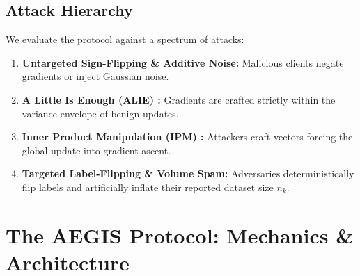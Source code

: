 \documentclass[10pt, conference]{IEEEtran}
\begin{document}
\subsection{Attack Hierarchy}
We evaluate the protocol against a spectrum of attacks:
\begin{enumerate}
    \item \textbf{Untargeted Sign-Flipping \& Additive Noise:} Malicious clients negate gradients or inject Gaussian noise.
    \item \textbf{A Little Is Enough (ALIE) \cite{baruch2019}:} Gradients are crafted strictly within the variance envelope of benign updates.
    \item \textbf{Inner Product Manipulation (IPM) \cite{xie2020ipm}:} Attackers craft vectors forcing the global update into gradient ascent.
    \item \textbf{Targeted Label-Flipping \& Volume Spam:} Adversaries deterministically flip labels and artificially inflate their reported dataset size $n_k$.
\end{enumerate}

\section{The AEGIS Protocol: Mechanics \& Architecture}
\end{document}
